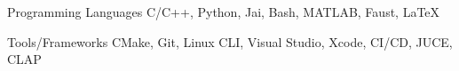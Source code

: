 

\begin{cvskills}

  \cvskill
    {Programming Languages} %
    {C/C++, Python, Jai, Bash, MATLAB, Faust, LaTeX} %

    \cvskill
    {Tools/Frameworks} %
    {CMake, Git, Linux CLI, Visual Studio, Xcode, CI/CD, JUCE, CLAP} %


\end{cvskills}
